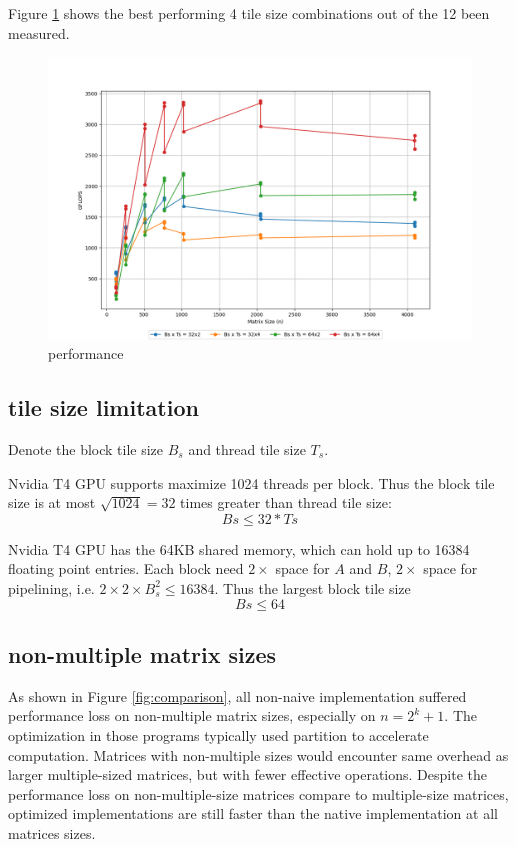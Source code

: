 \documentclass{article}
\begin{document}
Figure \ref{fig:result} shows the best performing 4 tile size combinations out of the 12 been measured.
\begin{figure}[h]
    \centering
    \includegraphics[width=\linewidth]{img/result.png}
    \caption{performance}
    \label{fig:result}
\end{figure}

\subsection{tile size limitation}
Denote the block tile size $B_s$ and thread tile size $T_s$.

Nvidia T4 GPU supports maximize 1024 threads per block.
Thus the block tile size is at most $\sqrt{1024}=32$ times greater than thread tile size:
$$Bs \le 32*Ts$$

Nvidia T4 GPU has the 64KB shared memory, which can hold up to 16384 floating point entries.
Each block need $2\times$ space for $A$ and $B$, $2\times$ space for pipelining, 
i.e. $2\times2\times B_s^2 \le 16384 $.
Thus the largest block tile size 
$$Bs \le 64$$

\subsection{non-multiple matrix sizes}
As shown in Figure \ref{fig:comparison}, all non-naive implementation suffered performance loss 
on non-multiple matrix sizes, especially on $n=2^k+1$.
The optimization in those programs typically used partition to accelerate computation. 
Matrices with non-multiple sizes would encounter same overhead as larger multiple-sized matrices,
but with fewer effective operations.
Despite the performance loss on non-multiple-size matrices compare to multiple-size matrices, 
optimized implementations are still faster than the native implementation at all matrices sizes.
\end{document}
